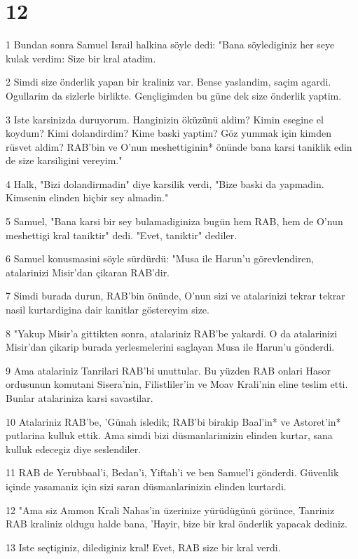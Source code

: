 \chapter{12}

\par 1 Bundan sonra Samuel Israil halkina söyle dedi: "Bana söylediginiz her seye kulak verdim: Size bir kral atadim.
\par 2 Simdi size önderlik yapan bir kraliniz var. Bense yaslandim, saçim agardi. Ogullarim da sizlerle birlikte. Gençligimden bu güne dek size önderlik yaptim.
\par 3 Iste karsinizda duruyorum. Hanginizin öküzünü aldim? Kimin esegine el koydum? Kimi dolandirdim? Kime baski yaptim? Göz yummak için kimden rüsvet aldim? RAB'bin ve O'nun meshettiginin* önünde bana karsi taniklik edin de size karsiligini vereyim."
\par 4 Halk, "Bizi dolandirmadin" diye karsilik verdi, "Bize baski da yapmadin. Kimsenin elinden hiçbir sey almadin."
\par 5 Samuel, "Bana karsi bir sey bulamadiginiza bugün hem RAB, hem de O'nun meshettigi kral taniktir" dedi. "Evet, taniktir" dediler.
\par 6 Samuel konusmasini söyle sürdürdü: "Musa ile Harun'u görevlendiren, atalarinizi Misir'dan çikaran RAB'dir.
\par 7 Simdi burada durun, RAB'bin önünde, O'nun sizi ve atalarinizi tekrar tekrar nasil kurtardigina dair kanitlar göstereyim size.
\par 8 "Yakup Misir'a gittikten sonra, atalariniz RAB'be yakardi. O da atalarinizi Misir'dan çikarip burada yerlesmelerini saglayan Musa ile Harun'u gönderdi.
\par 9 Ama atalariniz Tanrilari RAB'bi unuttular. Bu yüzden RAB onlari Hasor ordusunun komutani Sisera'nin, Filistliler'in ve Moav Krali'nin eline teslim etti. Bunlar atalariniza karsi savastilar.
\par 10 Atalariniz RAB'be, 'Günah isledik; RAB'bi birakip Baal'in* ve Astoret'in* putlarina kulluk ettik. Ama simdi bizi düsmanlarimizin elinden kurtar, sana kulluk edecegiz diye seslendiler.
\par 11 RAB de Yerubbaal'i, Bedan'i, Yiftah'i ve ben Samuel'i gönderdi. Güvenlik içinde yasamaniz için sizi saran düsmanlarinizin elinden kurtardi.
\par 12 "Ama siz Ammon Krali Nahas'in üzerinize yürüdügünü görünce, Tanriniz RAB kraliniz oldugu halde bana, 'Hayir, bize bir kral önderlik yapacak dediniz.
\par 13 Iste seçtiginiz, dilediginiz kral! Evet, RAB size bir kral verdi.
